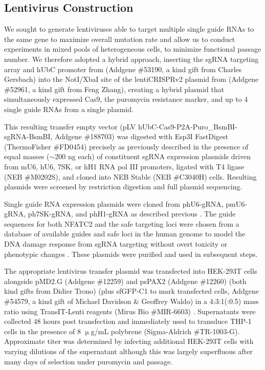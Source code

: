 \subsection{Lentivirus Construction}\label{lenti}

We sought to generate lentiviruses able to target multiple single guide RNAs to the same gene to maximize overall mutation rate and allow us to conduct experiments in mixed pools of heterogeneous cells, to minimize functional passage number. We therefore adopted a hybrid approach, inserting the sgRNA targeting array and hUbC promoter from \citet{Kabadi2014} (Addgene \#53190, a kind gift from Charles Gersbach) into the NotI/XbaI site of the lentiCRISPRv2 plasmid from \citet{Sanjana2014} (Addgene \#52961, a kind gift from Feng Zhang), creating a hybrid plasmid that simultaneously expressed Cas9, the puromycin resistance marker, and up to 4 single guide RNAs from a single plasmid.

This resulting transfer empty vector (pLV hUbC\hyp{}Cas9\hyp{}P2A\hyp{}Puro\_BsmBI\hyp{}sgRNA\hyp{}BsmBI, Addgene \#188703) was digested with Esp3I FastDigest (ThermoFisher \#FD0454) precisely as previously described \citep{Kabadi2014} in the presence of equal masses ($\sim$200 ng each) of constituent sgRNA expression plasmids driven from mU6, hU6, 7SK, or hH1 RNA pol III promoters, ligated with T4 ligase (NEB \#M0202S), and cloned into NEB Stable (NEB \#C3040H) cells. Resulting plasmids were screened by restriction digestion and full plasmid sequencing. 

Single guide RNA expression plasmids were cloned from phU6\hyp{}gRNA, pmU6\hyp{}gRNA, ph7SK\hyp{}gRNA, and phH1\hyp{}gRNA as described previous \citep{Kabadi2014}. The guide sequences for both NFATC2 and the safe targeting loci were chosen from a database of available guides and safe loci in the human genome to model the DNA damage response from sgRNA targeting without overt toxicity or phenotypic changes \citep{Morgens2017}. These plasmids were purified and used in subsequent steps.

The appropriate lentivirus transfer plasmid was transfected into HEK\hyp{}293T cells alongside pMD2.G (Addgene \#12259) and psPAX2 (Addgene \#12260) (both kind gifts from Didier Trono) (plus sfGFP\hyp{}C1 to mark transfected cells, Addgene \#54579, a kind gift of Michael Davidson \& Geoffrey Waldo) in a 4:3:1(:0.5) mass ratio using TransIT\hyp{}Lenti reagents (Mirus Bio \#MIR\hyp{}6603) \citep{Pedelacq2006}. Supernatants were collected 48 hours post transfection and immediately used to transduce THP\hyp{}1 cells in the presence of 8 $\upmu$g/mL polybrene (Sigma\hyp{}Aldrich \#TR\hyp{}1003\hyp{}G). Approximate titer was determined by infecting additional HEK\hyp{}293T cells with varying dilutions of the supernatant although this was largely superfluous after many days of selection under puromycin and passage.

